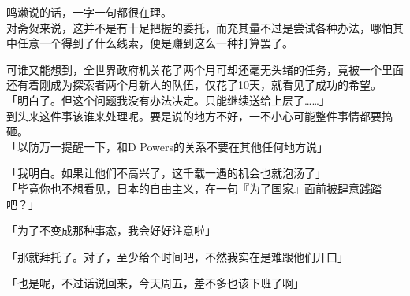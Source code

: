 鸣濑说的话，一字一句都很在理。\\

对斋贺来说，这并不是有十足把握的委托，而充其量不过是尝试各种办法，哪怕其中任意一个得到了什么线索，便是赚到这么一种打算罢了。

可谁又能想到，全世界政府机关花了两个月可却还毫无头绪的任务，竟被一个里面还有着刚成为探索者两个月新人的队伍，仅花了10天，就看见了成功的希望。\\

「明白了。但这个问题我没有办法决定。只能继续送给上层了……」\\

到头来这件事该谁来处理呢。要是说的地方不好，一不小心可能整件事情都要搞砸。\\

「以防万一提醒一下，和D Powers的关系不要在其他任何地方说」

「我明白。如果让他们不高兴了，这千载一遇的机会也就泡汤了」\\

「毕竟你也不想看见，日本的自由主义，在一句『为了国家』面前被肆意践踏吧？」

「为了不变成那种事态，我会好好注意啦」

「那就拜托了。对了，至少给个时间吧，不然我实在是难跟他们开口」

「也是呢，不过话说回来，今天周五，差不多也该下班了啊」

